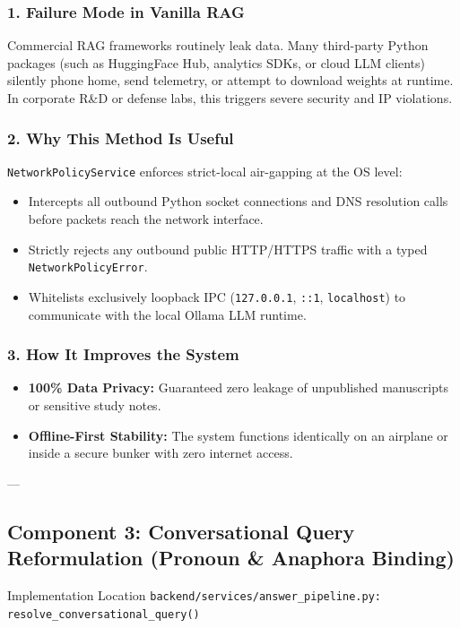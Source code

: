 \documentclass[11pt,a4paper]{article}
\begin{document}
\subsubsection{1. Failure Mode in Vanilla RAG}
Commercial RAG frameworks routinely leak data. Many third-party Python packages (such as HuggingFace Hub, analytics SDKs, or cloud LLM clients) silently phone home, send telemetry, or attempt to download weights at runtime. In corporate R\&D or defense labs, this triggers severe security and IP violations.

\subsubsection{2. Why This Method Is Useful}
\texttt{NetworkPolicyService} enforces strict-local air-gapping at the OS level:
\begin{itemize}[leftmargin=*]
    \item Intercepts all outbound Python socket connections and DNS resolution calls before packets reach the network interface.
    \item Strictly rejects any outbound public HTTP/HTTPS traffic with a typed \texttt{NetworkPolicyError}.
    \item Whitelists exclusively loopback IPC (\texttt{127.0.0.1}, \texttt{::1}, \texttt{localhost}) to communicate with the local Ollama LLM runtime.
\end{itemize}

\subsubsection{3. How It Improves the System}
\begin{itemize}[leftmargin=*]
    \item \textbf{100\% Data Privacy:} Guaranteed zero leakage of unpublished manuscripts or sensitive study notes.
    \item \textbf{Offline-First Stability:} The system functions identically on an airplane or inside a secure bunker with zero internet access.
\end{itemize}

---

\subsection{Component 3: Conversational Query Reformulation (Pronoun \& Anaphora Binding)}
\begin{codebox}{Implementation Location}
\texttt{backend/services/answer\_pipeline.py: resolve\_conversational\_query()}
\end{codebox}
\end{document}
